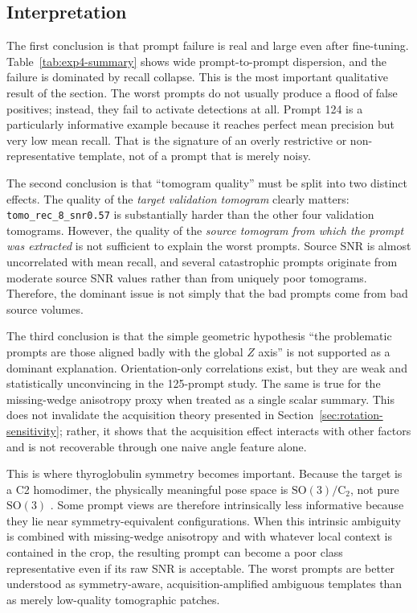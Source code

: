 \documentclass[12pt,a4paper]{report}
\begin{document}
\subsection{Interpretation}
The first conclusion is that prompt failure is real and large even after fine-tuning. Table~\ref{tab:exp4-summary} shows wide prompt-to-prompt dispersion, and the failure is dominated by recall collapse. This is the most important qualitative result of the section. The worst prompts do not usually produce a flood of false positives; instead, they fail to activate detections at all. Prompt 124 is a particularly informative example because it reaches perfect mean precision but very low mean recall. That is the signature of an overly restrictive or non-representative template, not of a prompt that is merely noisy.

The second conclusion is that \enquote{tomogram quality} must be split into two distinct effects. The quality of the \emph{target validation tomogram} clearly matters: \texttt{tomo\_rec\_8\_snr0.57} is substantially harder than the other four validation tomograms. However, the quality of the \emph{source tomogram from which the prompt was extracted} is not sufficient to explain the worst prompts. Source SNR is almost uncorrelated with mean recall, and several catastrophic prompts originate from moderate source SNR values rather than from uniquely poor tomograms. Therefore, the dominant issue is not simply that the bad prompts come from bad source volumes.

The third conclusion is that the simple geometric hypothesis \enquote{the problematic prompts are those aligned badly with the global \(Z\) axis} is not supported as a dominant explanation. Orientation-only correlations exist, but they are weak and statistically unconvincing in the 125-prompt study. The same is true for the missing-wedge anisotropy proxy when treated as a single scalar summary. This does not invalidate the acquisition theory presented in Section~\ref{sec:rotation-sensitivity}; rather, it shows that the acquisition effect interacts with other factors and is not recoverable through one naive angle feature alone.

This is where thyroglobulin symmetry becomes important. Because the target is a C2 homodimer, the physically meaningful pose space is \(\mathrm{SO}(3)/\mathrm{C}_2\), not pure \(\mathrm{SO}(3)\) \cite{adaixo2022thyroglobulin}. Some prompt views are therefore intrinsically less informative because they lie near symmetry-equivalent configurations. When this intrinsic ambiguity is combined with missing-wedge anisotropy and with whatever local context is contained in the crop, the resulting prompt can become a poor class representative even if its raw SNR is acceptable. The worst prompts are better understood as symmetry-aware, acquisition-amplified ambiguous templates than as merely low-quality tomographic patches.
\end{document}
